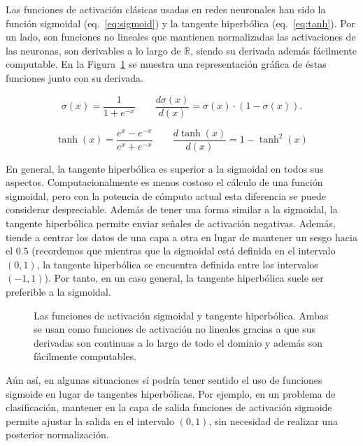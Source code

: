 Las funciones de activación clásicas usadas en redes neuronales han sido la función sigmoidal (eq.~\ref{eq:sigmoid}) y la tangente hiperbólica (eq.~\ref{eq:tanh}). Por un lado, son funciones no lineales que mantienen normalizadas las activaciones de las neuronas, son derivables a lo largo de $\mathbb{R}$, siendo su derivada además fácilmente computable. En la Figura~\ref{fig:sig-and-tanh} se muestra una representación gráfica de éstas funciones junto con su derivada.

\begin{equation}
	\sigma (x) = \frac{1}{1+e^{-x}} \qquad
	\frac{d\sigma (x)}{d(x)} = \sigma (x)\cdot (1-\sigma(x)).
	\label{eq:sigmoid}
\end{equation}

\begin{equation}
	\tanh(x) = \frac{e^x - e^{-x}}{e^x+e^{-x}} \qquad
	\frac{d\tanh (x)}{d(x)} = 1 - \tanh^2(x)
	\label{eq:tanh}
\end{equation}

En general, la tangente hiperbólica es superior a la sigmoidal en todos sus aspectos. Computacionalmente es menos costoso el cálculo de una función sigmoidal, pero con la potencia de cómputo actual esta diferencia se puede considerar despreciable. Además de tener una forma similar a la sigmoidal, la tangente hiperbólica permite enviar señales de activación negativas. Además, tiende a centrar los datos de una capa a otra en lugar de mantener un sesgo hacia el $0.5$ (recordemos que mientras que la sigmoidal está definida en el intervalo $(0, 1)$, la tangente hiperbólica se encuentra definida entre los intervalos $(-1, 1)$). Por tanto, en un caso general, la tangente hiperbólica suele ser preferible a la sigmoidal.

\begin{figure}[t]
	\centering
	\qquad
	\caption[Funciones de activación: sigmoide y tangente hiperbólica]{Las funciones de activación sigmoidal y tangente hiperbólica. Ambas se usan como funciones de activación no lineales gracias a que sus derivadas son continuas a lo largo de todo el dominio y además son fácilmente computables.}
	\label{fig:sig-and-tanh}
\end{figure}

Aún así, en algunas situaciones sí podría tener sentido el uso de funciones sigmoide en lugar de tangentes hiperbólicas. Por ejemplo, en un problema de clasificación, mantener en la capa de salida funciones de activación sigmoide permite ajustar la salida en el intervalo $(0, 1)$, sin necesidad de realizar una posterior normalización.

